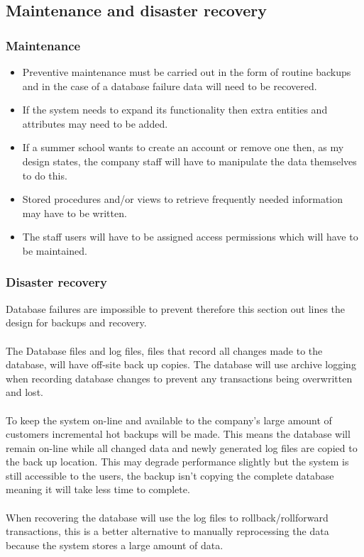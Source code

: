 \documentclass{project}
\begin{document}
\subsection{Maintenance and disaster recovery}
\subsubsection{Maintenance}
\begin{itemize}
\item Preventive maintenance must be carried out in the form of routine backups and in the case of a database failure data will need to be recovered.
\item If the system needs to expand its functionality then extra entities and attributes may need to be added. 
\item If a summer school wants to create an account or remove one then, as my design states, the company staff will have to manipulate the data themselves to do this. 
\item Stored procedures and/or views to retrieve frequently needed information may have to be written.
\item The staff users will have to be assigned access permissions which will have to be maintained.
\end{itemize}
\subsubsection{Disaster recovery}
Database failures are impossible to prevent therefore this section out lines the design for backups and recovery.
\\\\
The Database files and log files, files that record all changes made to the database, will have off-site back up copies. The database will use archive logging when recording database changes to prevent any transactions being overwritten and lost.
\\\\
To keep the system on-line and available to the company's large amount of customers
incremental hot backups will be made. This means the database will remain on-line while all changed data and newly generated log files are copied to the back up location. This may degrade performance slightly but the system is still accessible to the users, the backup isn't copying the complete database meaning it will take less time to complete.
\\\\
When recovering the database will use the log files to rollback/rollforward transactions, this is a better alternative to manually reprocessing the data because the system stores a large amount of data.
\newpage
\end{document}
